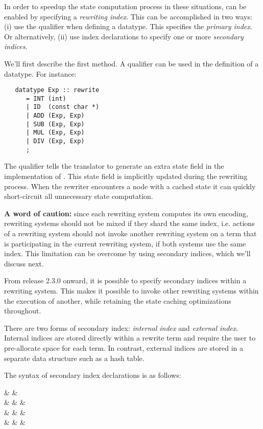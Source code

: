 In order to speedup the state computation process in these situations,
{\em {}} can be enabled by
specifying a {\em rewriting index}.
This can be accomplished in two ways: (i) use the qualifier
 when defining a datatype.  This specifies the
{\em primary index}.  Or alternatively, (ii) use index declarations
to specify one or more {\em secondary indices}.

We'll first describe the first method. 
A  qualifier can be used 
in the definition of a datatype.  For instance:
 
\begin{verbatim}
   datatype Exp :: rewrite
      = INT (int)
      | ID  (const char *)
      | ADD (Exp, Exp)
      | SUB (Exp, Exp)
      | MUL (Exp, Exp)
      | DIV (Exp, Exp)
      ;
\end{verbatim}

The  qualifier tells the translator to generate an extra
state field in the implementation of .  This state field is implicitly
updated during the rewriting process.  When the rewriter encounters a
node with a cached state it can quickly short-circuit all unnecessary
state computation.

{\bf A word of caution:} since each rewriting system computes
its own encoding, rewriting systems should not be mixed if they shard the 
same index, i.e. actions of a 
rewriting system should not invoke another rewriting
system on a term that is participating in the current rewriting system,
if both systems use the same index.  This limitation can be overcome
by using secondary indices, which we'll discuss next.


From release 2.3.0 onward, it is possible to specify secondary indices
within a rewriting system.  This makes it possible to invoke other
rewriting systems within the execution of another, while retaining the
state caching optimizations throughout.

There are two forms of secondary index: {\em internal index} and 
{\em external index}.  Internal indices are stored directly within
a rewrite term and require the user to pre-allocate space for each term.
In contrast, external indices are stored in a separate data structure
such as a hash table. 

The syntax of secondary index declarations is as follows:
\begin{syntax}
 & \IS &   \T{;} \\
 & \IS & 
   \TypeExp \T{=}  &  \\
   & \OR & \TypeExp \T{=}  &  \\
   & \OR & \TypeExp \T{=}   &  \\
\end{syntax}


